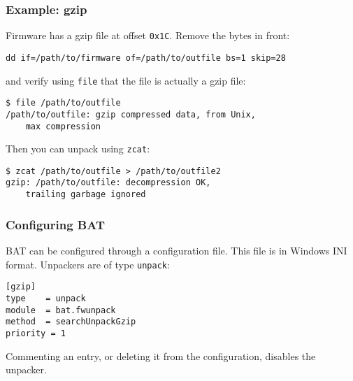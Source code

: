 \documentclass[11pt]{beamer}
\begin{document}
\begin{frame}[fragile]
\frametitle{Example: gzip}
Firmware has a gzip file at offset \texttt{0x1C}. Remove the bytes in front:

\texttt{dd if=/path/to/firmware of=/path/to/outfile bs=1 skip=28}

and verify using \texttt{file} that the file is actually a gzip file:

\begin{verbatim}
$ file /path/to/outfile 
/path/to/outfile: gzip compressed data, from Unix,
    max compression
\end{verbatim}

Then you can unpack using \texttt{zcat}:

\begin{verbatim}
$ zcat /path/to/outfile > /path/to/outfile2
gzip: /path/to/outfile: decompression OK,
    trailing garbage ignored
\end{verbatim}
\end{frame}



\begin{frame}[fragile]
\frametitle{Configuring BAT}
BAT can be configured through a configuration file. This file is in Windows INI format. Unpackers are of type \texttt{unpack}:

\begin{verbatim}
[gzip]
type    = unpack
module  = bat.fwunpack
method  = searchUnpackGzip
priority = 1
\end{verbatim}

Commenting an entry, or deleting it from the configuration, disables the unpacker.
\end{frame}
\end{document}
